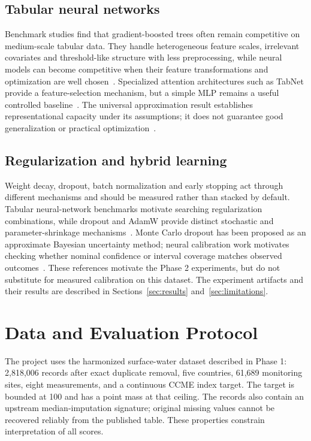 \documentclass[conference]{IEEEtran}
\begin{document}
\subsection{Tabular neural networks}
Benchmark studies find that gradient-boosted trees often remain competitive on medium-scale tabular data. They handle heterogeneous feature scales, irrelevant covariates and threshold-like structure with less preprocessing, while neural models can become competitive when their feature transformations and optimization are well chosen~\cite{grinsztajn2022why,shwartzziv2022tabular,borisov2022deep,gorishniy2021revisiting}. Specialized attention architectures such as TabNet provide a feature-selection mechanism, but a simple MLP remains a useful controlled baseline~\cite{arik2021tabnet}. The universal approximation result establishes representational capacity under its assumptions; it does not guarantee good generalization or practical optimization~\cite{hornik1989multilayer}.

\subsection{Regularization and hybrid learning}
Weight decay, dropout, batch normalization and early stopping act through different mechanisms and should be measured rather than stacked by default. Tabular neural-network benchmarks motivate searching regularization combinations, while dropout and AdamW provide distinct stochastic and parameter-shrinkage mechanisms~\cite{kadra2021well,srivastava2014dropout,ioffe2015batch,loshchilov2018decoupled}. Monte Carlo dropout has been proposed as an approximate Bayesian uncertainty method; neural calibration work motivates checking whether nominal confidence or interval coverage matches observed outcomes~\cite{gal2016dropout,guo2017calibration}. These references motivate the Phase 2 experiments, but do not substitute for measured calibration on this dataset. The experiment artifacts and their results are described in Sections~\ref{sec:results} and~\ref{sec:limitations}.

\section{Data and Evaluation Protocol}
The project uses the harmonized surface-water dataset described in Phase 1: 2,818,006 records after exact duplicate removal, five countries, 61,689 monitoring sites, eight measurements, and a continuous CCME index target. The target is bounded at 100 and has a point mass at that ceiling. The records also contain an upstream median-imputation signature; original missing values cannot be recovered reliably from the published table. These properties constrain interpretation of all scores.
\end{document}
